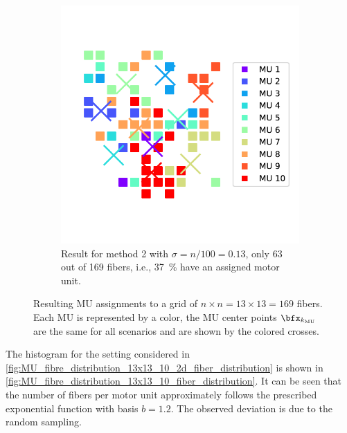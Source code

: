 \begin{figure}
\begin{subfigure}[t]{0.48\textwidth}
    \includegraphics[width=\textwidth]{images/motor_unit_assignment/MU_fibre_distribution_sparse_13x13_10_sigma_2d_fiber_distribution.pdf}%
    \caption{Result for method 2 with $\sigma = n/100 = 0.13$, only 63 out of 169 fibers, i.e., \SI{37}{\percent} have an assigned motor unit.}%
    \label{fig:MU_fibre_distribution_sparse_13x13_10_sigma_2d_fiber_distribution}%
  \end{subfigure}
  \caption{Resulting MU assignments to a grid of $n\times n = 13 \times 13 = 169$ fibers. Each MU is represented by a color, the MU center points $\bfx_{k_\text{MU}}$ are the same for all scenarios and are shown by the colored crosses.}%
  \label{fig:mus_results1}%
\end{figure}%

The histogram for the setting considered in \cref{fig:MU_fibre_distribution_13x13_10_2d_fiber_distribution} is shown in \cref{fig:MU_fibre_distribution_13x13_10_fiber_distribution}. It can be seen that the number of fibers per motor unit approximately follows the prescribed exponential function with basis $b=1.2$. The observed deviation is due to the random sampling.

